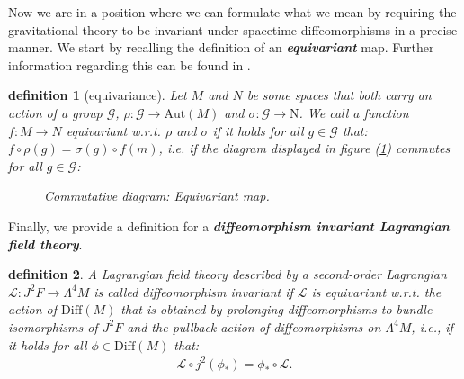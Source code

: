 \documentclass[a4paper,12pt, DIV=14, BCOR=5mm, twoside, headsepline, numbers=noenddot]{scrbook}
\newtheorem{definition}{definition}[section]
\begin{document}
Now we are in a position where we can formulate what we mean by requiring the gravitational theory to be invariant under spacetime diffeomorphisms in a precise manner. We start by recalling the definition of an \textit{\textbf{equivariant}} map. Further information regarding this can be found in \cite{doi:10.1142/3867}.
\begin{definition}[equivariance]
Let $M$ and $N$ be some spaces that both carry an action of a group $\mathcal{G}$, $\rho : \mathcal{G} \rightarrow \mathrm{Aut}(M)$ and $\sigma : \mathcal{G} \rightarrow \mathrm{N}$. We call a function $f : M \rightarrow N$ equivariant w.r.t. $\rho$ and $\sigma$ if it holds for all $g \in \mathcal{G}$ that: $f \circ \rho(g) = \sigma(g) \circ f(m)$, i.e. if the diagram displayed in figure (\ref{EquiDia}) commutes for all $g \in \mathcal{G}$:
\begin{figure}[hbt!]
\centering
{}
\caption{Commutative diagram: Equivariant map.}\label{EquiDia}
\end{figure}
\end{definition}
Finally, we provide a definition for a \textit{\textbf{diffeomorphism invariant Lagrangian field theory}}.
\begin{definition}
A Lagrangian field theory described by a second-order Lagrangian $\mathcal{L} : J^2F \rightarrow \Lambda^4 M$ is called diffeomorphism invariant if $\mathcal{L}$ is equivariant w.r.t. the action of $\mathrm{Diff}(M)$ that is obtained by prolonging diffeomorphisms to bundle isomorphisms of $J^2F$ and the pullback action of diffeomorphisms on $\Lambda^4M$, i.e., if it holds for all $\phi \in \mathrm{Diff}(M)$ that: 
\begin{align}
     \mathcal{L}\circ j^2(\phi_{\ast}) = \phi_{\ast} \circ \mathcal{L}.
\end{align}
\end{definition}
\end{document}
